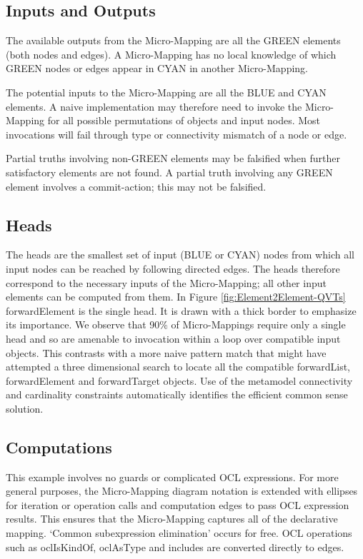 \documentclass[conference]{IEEEtran}
\begin{document}
\subsection{Inputs and Outputs}

The available outputs from the Micro-Mapping are all the GREEN elements (both nodes and edges). A Micro-Mapping has no local knowledge of which GREEN nodes or edges appear in CYAN in another Micro-Mapping.

The potential inputs to the Micro-Mapping are all the BLUE and CYAN elements. A naive implementation may therefore need to invoke the Micro-Mapping for all possible permutations of objects and input nodes. Most invocations will fail through type or connectivity mismatch of a node or edge. 

Partial truths involving non-GREEN elements may be falsified when further satisfactory elements are not found. A partial truth involving any GREEN element involves a commit-action; this may not be falsified. 

\subsection{Heads}
   
The heads are the smallest set of input (BLUE or CYAN) nodes from which all input nodes can be reached by following directed edges. %
The heads therefore correspond to the necessary inputs of the Micro-Mapping; all other input elements can be computed from them. In Figure \ref{fig:Element2Element-QVTs} forwardElement is the single head. It is drawn with a thick border to emphasize its importance. We observe that 90\% of Micro-Mappings require only a single head and so are amenable to invocation within a loop over compatible input objects. This contrasts with a more naive pattern match that might have attempted a three dimensional search to locate all the compatible forwardList, forwardElement and forwardTarget objects. Use of the metamodel connectivity and cardinality constraints  automatically identifies the efficient common sense solution.

\subsection{Computations}

This example involves no guards or complicated OCL expressions. For more general purposes, the Micro-Mapping diagram notation is extended with ellipses for iteration or operation calls and computation edges to pass OCL expression results. This ensures that the Micro-Mapping captures all of the declarative mapping. `Common subexpression elimination' occurs for free. OCL operations such as oclIsKindOf, oclAsType and includes are converted directly to edges.
\end{document}
